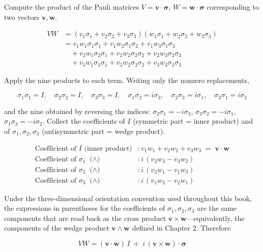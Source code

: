 Compute the product of the Pauli matrices
\(V = \mathbf{v}\!\cdot\!\bm{\sigma}\),
\(W = \mathbf{w}\!\cdot\!\bm{\sigma}\) corresponding to two vectors
\(\mathbf{v}, \mathbf{w}\).

\[
\begin{aligned}
VW &= (v_1\sigma_1 + v_2\sigma_2 + v_3\sigma_3)(w_1\sigma_1 + w_2\sigma_2 + w_3\sigma_3) \\[4pt]
&= v_1w_1\sigma_1\sigma_1 + v_1w_2\sigma_1\sigma_2 + v_1w_3\sigma_1\sigma_3 \\
&\quad + v_2w_1\sigma_2\sigma_1 + v_2w_2\sigma_2\sigma_2 + v_2w_3\sigma_2\sigma_3 \\
&\quad + v_3w_1\sigma_3\sigma_1 + v_3w_2\sigma_3\sigma_2 + v_3w_3\sigma_3\sigma_3
\end{aligned}
\]

Apply the nine products to each term. Writing only the nonzero
replacements,

\[
\sigma_1\sigma_1 = I,\quad \sigma_2\sigma_2 = I,\quad \sigma_3\sigma_3 = I,\quad
\sigma_1\sigma_2 = i\sigma_3,\quad \sigma_2\sigma_3 = i\sigma_1,\quad \sigma_3\sigma_1 = i\sigma_2
\]

and the nine obtained by reversing the indices:
\(\sigma_2\sigma_1 = -i\sigma_3\), \(\sigma_3\sigma_2 = -i\sigma_1\),
\(\sigma_1\sigma_3 = -i\sigma_2\). Collect the coefficients of \(I\)
(symmetric part = inner product) and of \(\sigma_1,\sigma_2,\sigma_3\)
(antisymmetric part = wedge product).

\[
\begin{aligned}
\text{Coefficient of }I\text{ (inner product)} &: v_1w_1 + v_2w_2 + v_3w_3 \;=\; \mathbf{v}\!\cdot\!\mathbf{w} \\
\text{Coefficient of }\sigma_1\text{ ($\wedge$)} &: i\,(v_2w_3 - v_3w_2) \\
\text{Coefficient of }\sigma_2\text{ ($\wedge$)} &: i\,(v_3w_1 - v_1w_3) \\
\text{Coefficient of }\sigma_3\text{ ($\wedge$)} &: i\,(v_1w_2 - v_2w_1)
\end{aligned}
\]

Under the three-dimensional orientation convention used throughout this
book, the expressions in parentheses for the coefficients of
\(\sigma_1,\sigma_2,\sigma_3\) are the same components that are read
back as the cross product \(\mathbf{v}\times\mathbf{w}\)---equivalently,
the components of the wedge product \(\mathbf{v}\wedge\mathbf{w}\)
defined in Chapter 2. Therefore

\[VW = (\mathbf{v}\!\cdot\!\mathbf{w})\,I \;+\; i\,(\mathbf{v}\times\mathbf{w})\!\cdot\!\bm{\sigma}\]

